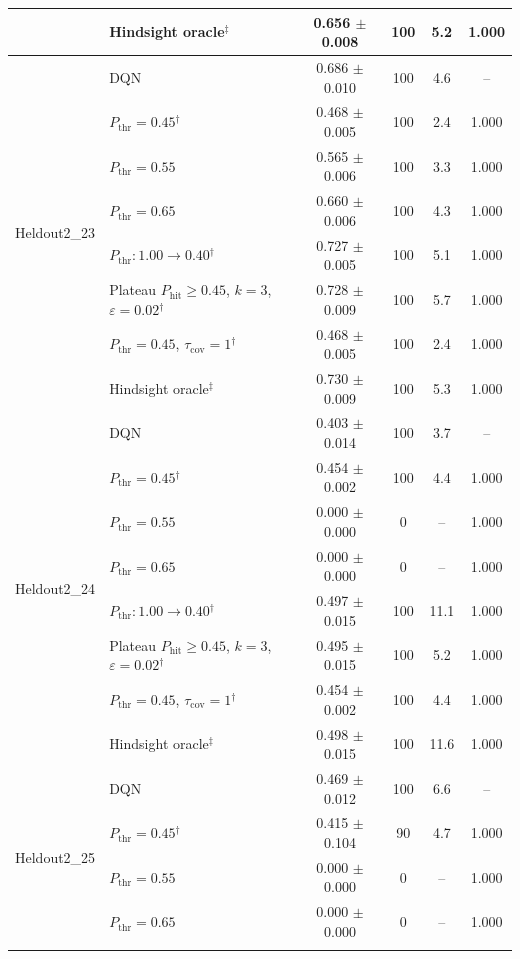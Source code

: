 \begin{table}[htbp]
\begin{tabular}{llcccc}
 & Hindsight oracle$^{\ddagger}$ & 0.656 $\pm$ 0.008 & 100 & 5.2 & 1.000 \\
\midrule
\multirow{8}{*}{Heldout2\_23} & DQN & 0.686 $\pm$ 0.010 & 100 & 4.6 & -- \\
 & $P_{\mathrm{thr}}=0.45$$^{\dagger}$ & 0.468 $\pm$ 0.005 & 100 & 2.4 & 1.000 \\
 & $P_{\mathrm{thr}}=0.55$ & 0.565 $\pm$ 0.006 & 100 & 3.3 & 1.000 \\
 & $P_{\mathrm{thr}}=0.65$ & 0.660 $\pm$ 0.006 & 100 & 4.3 & 1.000 \\
 & $P_{\mathrm{thr}}: 1.00 \to 0.40$$^{\dagger}$ & 0.727 $\pm$ 0.005 & 100 & 5.1 & 1.000 \\
 & Plateau $P_{\mathrm{hit}}\geq0.45$, $k=3$, $\varepsilon=0.02$$^{\dagger}$ & 0.728 $\pm$ 0.009 & 100 & 5.7 & 1.000 \\
 & $P_{\mathrm{thr}}=0.45$, $\tau_{\mathrm{cov}}=1$$^{\dagger}$ & 0.468 $\pm$ 0.005 & 100 & 2.4 & 1.000 \\
 & Hindsight oracle$^{\ddagger}$ & 0.730 $\pm$ 0.009 & 100 & 5.3 & 1.000 \\
\midrule
\multirow{8}{*}{Heldout2\_24} & DQN & 0.403 $\pm$ 0.014 & 100 & 3.7 & -- \\
 & $P_{\mathrm{thr}}=0.45$$^{\dagger}$ & 0.454 $\pm$ 0.002 & 100 & 4.4 & 1.000 \\
 & $P_{\mathrm{thr}}=0.55$ & 0.000 $\pm$ 0.000 & 0 & -- & 1.000 \\
 & $P_{\mathrm{thr}}=0.65$ & 0.000 $\pm$ 0.000 & 0 & -- & 1.000 \\
 & $P_{\mathrm{thr}}: 1.00 \to 0.40$$^{\dagger}$ & 0.497 $\pm$ 0.015 & 100 & 11.1 & 1.000 \\
 & Plateau $P_{\mathrm{hit}}\geq0.45$, $k=3$, $\varepsilon=0.02$$^{\dagger}$ & 0.495 $\pm$ 0.015 & 100 & 5.2 & 1.000 \\
 & $P_{\mathrm{thr}}=0.45$, $\tau_{\mathrm{cov}}=1$$^{\dagger}$ & 0.454 $\pm$ 0.002 & 100 & 4.4 & 1.000 \\
 & Hindsight oracle$^{\ddagger}$ & 0.498 $\pm$ 0.015 & 100 & 11.6 & 1.000 \\
\midrule
\multirow{8}{*}{Heldout2\_25} & DQN & 0.469 $\pm$ 0.012 & 100 & 6.6 & -- \\
 & $P_{\mathrm{thr}}=0.45$$^{\dagger}$ & 0.415 $\pm$ 0.104 & 90 & 4.7 & 1.000 \\
 & $P_{\mathrm{thr}}=0.55$ & 0.000 $\pm$ 0.000 & 0 & -- & 1.000 \\
 & $P_{\mathrm{thr}}=0.65$ & 0.000 $\pm$ 0.000 & 0 & -- & 1.000 \\
$$
\end{tabular}
\end{table}
